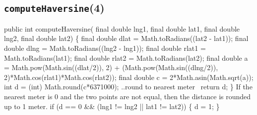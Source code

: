 \documentclass{article}
\def\nwendcode{\endtrivlist \endgroup}      %
\let\nwdocspar=\par
\begin{document}
\subsection{{\tt{}\protect{}computeHaversine}(4)}
\nwenddocs{}\endmoddef{}
public int computeHaversine(
    final double lng1, final double lat1, final double lng2, final double lat2) \{
  final double  dlat = Math.toRadians((lat2 - lat1));
  final double  dlng = Math.toRadians((lng2 - lng1));
  final double rlat1 = Math.toRadians(lat1);
  final double rlat2 = Math.toRadians(lat2);
  final double a = Math.pow(Math.sin((dlat/2)), 2)
    + (Math.pow(Math.sin((dlng/2)), 2)*Math.cos(rlat1)*Math.cos(rlat2));
  final double c = 2*Math.asin(Math.sqrt(a));
  int d = (int) Math.round(c*6371000);
  \LA{}..round to nearest meter~{\nwtagstyle{}}\RA{}
  return d;
\}
\eatline
{}\nwendcode{}If the nearest meter is 0 and the two points are not equal, then the distance
is rounded up to 1 meter.
\nwenddocs{}\endmoddef{}
if (d == 0 && (lng1 != lng2 || lat1 != lat2)) \{
  d = 1;
\}
\nwendcode{}\nwdocspar
\end{document}
